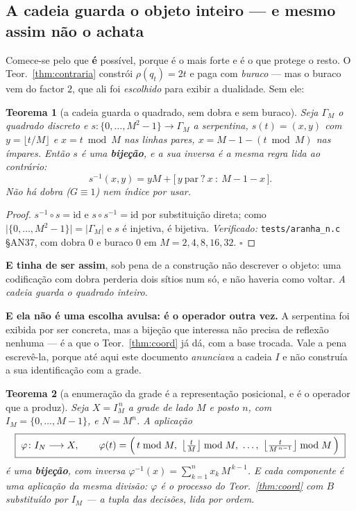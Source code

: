 \documentclass[11pt,a4paper]{article}
\newcommand{\code}[1]{\texttt{\small #1}}
\newtheorem{teorema}{Teorema}
\begin{document}
\subsection*{A cadeia guarda o objeto inteiro --- e mesmo assim não o achata}

\noindent Comece-se pelo que \textbf{é} possível, porque é o mais forte e é o que
protege o resto. O Teor.~\ref{thm:contraria} constrói $\rho(q_t)=2t$ e paga com
\emph{buraco} --- mas o buraco vem do factor $2$, que ali foi \emph{escolhido} para
exibir a dualidade. Sem ele:

\begin{teorema}[a cadeia guarda o quadrado, sem dobra e sem buraco]\label{thm:bijeccao}
Seja $\Gamma_M$ o quadrado discreto e $s\colon\{0,\dots,M^2-1\}\to\Gamma_M$ a
serpentina, $s(t)=(x,y)$ com $y=\lfloor t/M\rfloor$ e $x=t\bmod M$ nas linhas pares,
$x=M-1-(t\bmod M)$ nas ímpares. Então $s$ é uma \textbf{bijeção}, e a sua inversa é
a \emph{mesma regra} lida ao contrário:
\[
s^{-1}(x,y)=yM+\bigl[\,y\ \text{par}\ ?\ x\ :\ M-1-x\,\bigr].
\]
Não há dobra ($G\equiv1$) nem índice por usar.
\end{teorema}

\begin{proof}
$s^{-1}\circ s=\mathrm{id}$ e $s\circ s^{-1}=\mathrm{id}$ por substituição direta;
como $\lvert\{0,\dots,M^2-1\}\rvert=\lvert\Gamma_M\rvert$ e $s$ é injetiva, é
bijetiva. \emph{Verificado:} \code{tests/aranha\_n.c} §AN37, com dobra $0$ e buraco
$0$ em $M=2,4,8,16,32$. $\square$
\end{proof}

\medskip\noindent\textbf{E tinha de ser assim}, sob pena de a construção não
descrever o objeto: uma codificação com dobra perderia dois sítios num só, e não
haveria como voltar. \emph{A cadeia guarda o quadrado inteiro.}

\medskip\noindent\textbf{E ela não é uma escolha avulsa: é o operador outra vez.}
A serpentina foi exibida por ser concreta, mas a bijeção que interessa não precisa
de reflexão nenhuma --- é a que o Teor.~\ref{thm:coord} já dá, com a base trocada.
Vale a pena escrevê-la, porque até aqui este documento \emph{anunciava} a cadeia
$I$ e não construía a sua identificação com a grade.

\begin{teorema}[a enumeração da grade é a representação posicional, e é o operador que a produz]\label{thm:enumera}
Seja $X=I_M^{\,n}$ a grade de lado $M$ e posto $n$, com $I_M=\{0,\dots,M-1\}$, e
$N=M^{n}$. A aplicação
\[
\boxed{\;\varphi\colon I_N\longrightarrow X,\qquad
\varphi(t)=\Bigl(\,t\bmod M,\ \bigl\lfloor\tfrac{t}{M}\bigr\rfloor\bmod M,\ \dots,\
\bigl\lfloor\tfrac{t}{M^{\,n-1}}\bigr\rfloor\bmod M\,\Bigr)\;}
\]
é uma \textbf{bijeção}, com inversa $\varphi^{-1}(x)=\sum_{k=1}^{n}x_k\,M^{\,k-1}$.
E cada componente é uma aplicação da \emph{mesma} divisão: $\varphi$ é o processo do
Teor.~\ref{thm:coord} com $B$ substituído por $I_M$ --- a tupla das decisões, lida
por ordem.
\end{teorema}
\end{document}
